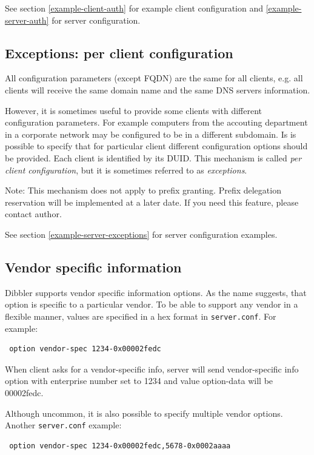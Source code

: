 See section \ref{example-client-auth} for example client configuration
and \ref{example-server-auth} for server configuration.

\subsection{Exceptions: per client configuration}
\label{features-exceptions}
All configuration parameters (except FQDN) are the same for all
clients, e.g. all clients will receive the same domain name and the
same DNS servers information. 

However, it is sometimes useful to provide some clients with different
configuration parameters. For example computers from the accouting
department in a corporate network may be configured to be in a
different subdomain. Is is possible to specify that for particular
client different configuration options should be provided. Each client
is identified by its DUID. This mechanism is called \emph{per client
  configuration}, but it is sometimes referred to as \emph{exceptions}.

Note: This mechanism does not apply to prefix granting. Prefix
delegation reservation will be implemented at a later date. If you
need this feature, please contact author.

See section \ref{example-server-exceptions} for server configuration examples.

\subsection{Vendor specific information}
Dibbler supports vendor specific information options. As the name
suggests, that option is specific to a particular vendor. To be able
to support any vendor in a flexible manner, values are specified in a
hex format in \verb+server.conf+. For example:

\begin{lstlisting}
 option vendor-spec 1234-0x00002fedc
\end{lstlisting}

When client asks for a vendor-specific info, server will send
vendor-specific info option with enterprise number set to 1234 and
value option-data will be 00002fedc.

Although uncommon, it is also possible to specify multiple vendor
options. Another \verb+server.conf+ example:

\begin{lstlisting}
 option vendor-spec 1234-0x00002fedc,5678-0x0002aaaa
\end{lstlisting}

